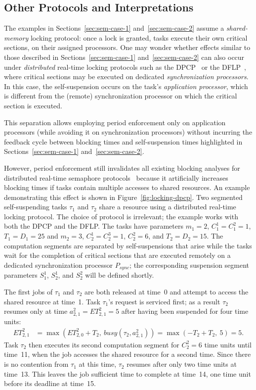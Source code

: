 \subsection{Other Protocols and Interpretations}

The examples in Sections~\ref{sec:sem-case-1} and~\ref{sec:sem-case-2} assume a \emph{shared-memory} locking protocol: once a lock is granted, tasks execute their own critical sections, on their assigned processors. One may wonder whether  effects similar to those described in Sections~\ref{sec:sem-case-1} and~\ref{sec:sem-case-2} can also occur under \emph{distributed} real-time locking protocols such as the DPCP~\cite{RSL:88} or the DFLP~\cite{Br:13,Br:14}, where critical sections may be executed on dedicated \emph{synchronization processors}. In this case, the self-suspension occurs on the task's \emph{application processor}, which is different from the (remote) synchronization processor on which the critical section is executed.

This separation allows employing period enforcement  only on application processors (while avoiding it on synchronization processors) without incurring the feedback cycle between blocking times and self-suspension times highlighted in Sections~\ref{sec:sem-case-1} and~\ref{sec:sem-case-2}.

However, period enforcement still invalidates all existing blocking analyses for distributed real-time semaphore protocols~\cite{RSL:88,Raj:91,Br:13} because it artificially increases blocking times if tasks contain multiple accesses to shared resources. An example demonstrating this effect is shown in Figure~\ref{fig:locking-dpcp}. Two segmented self-suspending tasks $\tau_1$ and $\tau_2$ share a resource using a distributed real-time locking protocol. The choice of protocol is irrelevant; the example works with both the DPCP and the DFLP. The tasks have parameters $m_1 = 2$, $C_1^1 = C_1^2 = 1$, $T_1 = D_1 = 25$ and $m_2 = 3$, $C_2^1 = C_2^3 = 1$, $C^2_2 = 6$, and $T_2 = D_2 = 15$. The computation segments are separated by self-suspensions that arise while the tasks wait for the completion of critical sections that are executed remotely on a dedicated synchronization processor $P_{sync}$; the corresponding suspension segment parameters $S_1^1$, $S_2^1$, and $S_2^2$ will be defined shortly.

The first jobs of $\tau_1$ and $\tau_2$ are both released at time~0 and attempt to access the shared resource at time~1. Task $\tau_1$'s request is serviced first; as a result $\tau_2$ resumes only at time $a^2_{2,1} = ET_{2,1}^2 = 5$ after having been suspended for four time units:
\begin{align*}
	ET_{2,1}^2 & = \max\left(ET_{2,0}^2 + T_2,\ \mathit{busy}(\tau_2, a^2_{2,1})\right) =\max(-T_2 + T_2,\ 5) = 5.
\end{align*}
Task $\tau_2$ then executes its second computation segment for $C_2^2 = 6$ time units until time~11, when the job accesses the shared resource for a second time. Since there is no contention from $\tau_1$ at this time, $\tau_2$ resumes after only two time units at time~13. This leaves the job sufficient time to complete at time~14, one time unit before its deadline at time~15.


